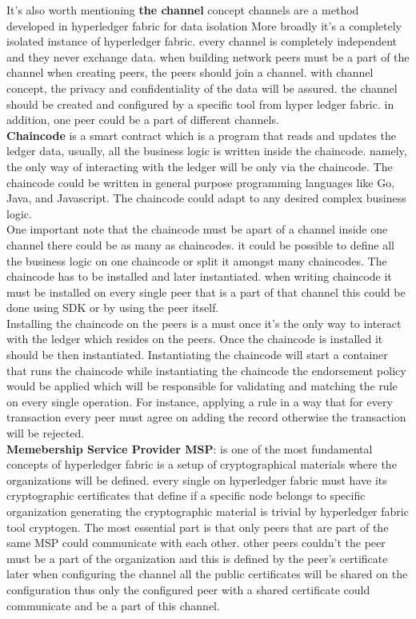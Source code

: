 It's also worth mentioning \textbf{the channel} concept channels are a method developed in hyperledger fabric for data isolation More broadly it's a completely isolated instance of hyperledger fabric. every channel is completely independent and they never exchange data. when building network peers must be a part of the channel when creating peers, the peers should join a channel. with channel concept, the privacy and confidentiality of the data will be assured. the channel should be created and configured by a specific tool from hyper ledger fabric. in addition, one peer could be a part of different channels.  \\
 

\textbf{Chaincode} is a smart contract which is a program that reads and updates the ledger data, usually, all the business logic is written inside the chaincode. namely, the only way of interacting with the ledger will be only via the chaincode. 
The chaincode could be written in general purpose programming languages like Go, Java, and Javascript. The chaincode could adapt to any desired complex business logic. \\

One important note that the chaincode must be apart of a channel inside one channel there could be as many as chaincodes. it could be possible to define all the business logic on one chaincode or split it amongst many chaincodes. 
The chaincode has to be installed and later instantiated. when writing chaincode it must be installed on every single peer that is a part of that channel this could be done using SDK or by using the peer itself. \\
 
Installing the chaincode on the peers is a must once it's the only way to interact with the ledger which resides on the peers. 
Once the chaincode is installed it should be then instantiated. 
Instantiating the chaincode will start a container that runs the chaincode while instantiating the chaincode the endorsement policy would be applied which will be responsible for validating and matching the rule on every single operation. For instance, applying a rule in a way  that for every transaction every peer must agree on adding the record otherwise the transaction will be rejected. \\
 
\textbf{Memebership Service Provider MSP}: is one of the most fundamental concepts of hyperledger fabric is a setup of cryptographical materials where the organizations will be defined. every single on hyperledger fabric must have its cryptographic certificates that define if a specific node belongs to specific organization generating the cryptographic material is trivial by hyperledger fabric tool cryptogen. 
The most essential part is that only peers that are part of the same MSP could communicate with each other. other peers couldn't the peer must be a part of the organization and this is defined by the peer's certificate later when configuring the channel all the public certificates will be shared on the configuration thus only the configured peer with a shared certificate could communicate and be a part of this channel. \\

